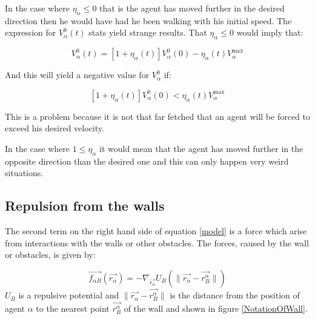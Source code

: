 \begin{itemize}
In the case where $\eta_{\alpha} \leq 0$ that is the agent has moved further 
in the desired direction then he would have had he been walking with his 
initial speed. The expression for $V_{\alpha}^{0} \left( t \right)$
stats yield strange results. That $\eta_{\alpha} \leq 0$ would imply that:

\begin{equation}\label{n}
    V_{\alpha}^{0} \left( t\right) = \left[ 1 + \eta_{\alpha} \left( t \right) \right] 
    V_{\alpha}^{0} \left( 0 \right) -
    \eta_{\alpha} \left( t \right)V_{\alpha}^{\text{max}}
\end{equation}

And this will yield a negative value for $V_{\alpha}^{0}$ if: 

\begin{equation}
\left[ 1 + \eta_{\alpha} \left( t \right) \right] 
V_{\alpha}^{0} \left( 0 \right) < \eta_{\alpha} \left( t \right)V_{\alpha}^{\text{max}} 
\end{equation}

This is a problem because it is not that far fetched that an agent will be 
forced to exceed his desired velocity.

In the case where $1 \leq \eta_{\alpha}$ it would mean that the agent has moved 
further in the opposite direction than the desired one and this can only happen very 
weird situations.
\end{itemize}






\subsection{Repulsion from the walls}
The second term on the right hand side of equation \eqref{model} is a force which arise from interactions with the walls or other obstacles. The forces, caused by the wall or obstacles, is given by:

\begin{equation}\label{wallpotential}
    \vec{f_{\alpha B}} \left( \vec{r_{\alpha}} \right) =
    - \nabla_{\vec{r_{\alpha}}} U_{B}
    \left( \| \vec{r_{\alpha}} - \vec{r_{B}^{\alpha}} \| \right)
\end{equation}
$U_B$ is a repulsive potential and $ \| \vec{r_{\alpha}} - \vec{r_{B}^{\alpha}} \|$ is the distance 
from the position of agent $\alpha$ to the nearest point $ \vec{r_{B}^{\alpha}}  $ of the wall and shown in figure \ref{NotationOfWall}.

